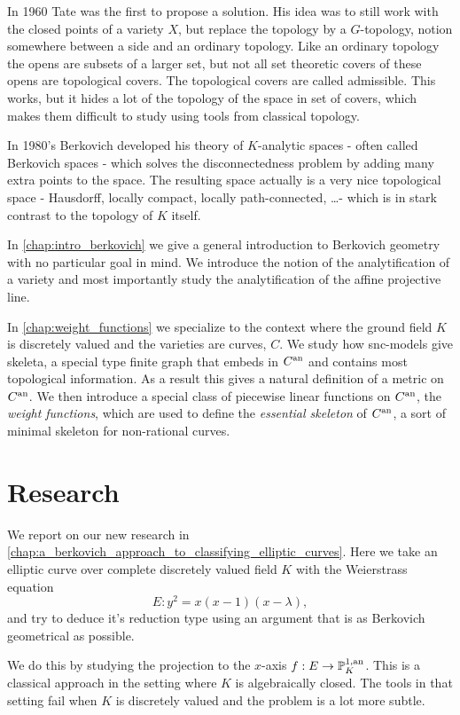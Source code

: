 In 1960 Tate was the first to propose a solution. 
His idea was to still work with the closed points of a variety $X$, but replace the topology by a $G$-topology, notion somewhere between a side and an ordinary topology. 
Like an ordinary topology the opens are subsets of a larger set, but not all set theoretic covers of these opens are topological covers. 
The topological covers are called admissible.
This works, but it hides a lot of the topology of the space in set of covers, which makes them difficult to study using tools from classical topology.

In 1980's Berkovich developed his theory of $K$-analytic spaces - often called Berkovich spaces - which solves the disconnectedness problem by adding many extra points to the space. 
The resulting space actually is a very nice topological space - Hausdorff, locally compact, locally path-connected, \ldots - which is in stark contrast to the topology of $K$ itself.  

\medskip 
In \cref{chap:intro_berkovich} we give a general introduction to Berkovich geometry with no particular goal in mind. 
We introduce the notion of the analytification of a variety and most importantly study the analytification of the affine projective line. 
 
In \cref{chap:weight_functions} we specialize to the context where the ground field $K$ is discretely valued and the varieties are curves, $C$.  
We study how snc-models give skeleta, a special type finite graph that embeds in $C{}^{\text{an}}$ and contains most topological information. 
As a result this gives a natural definition of a metric on $C{}^{\text{an}}$. 
We then introduce a special class of piecewise linear functions on $C{}^{\text{an}}$, the \emph{weight functions}, which are used to define the \emph{essential skeleton} of $C{}^{\text{an}}$, a sort of minimal skeleton for non-rational curves. 


\section{Research} \label{sec:research}

We report on our new research in \cref{chap:a_berkovich_approach_to_classifying_elliptic_curves}. 
Here we take  an elliptic curve over complete discretely valued field $K$ with the Weierstrass equation \[
	E: y^2 = x(x-1)(x-\lambda)
,\] 
and try to deduce it's reduction type using an argument that is as Berkovich geometrical as possible. 

We do this by studying the projection to the $x$-axis $f: E\to \mathbb{P}^{1, \text{an}}_K$.
This is a classical approach in the setting where $K$ is algebraically closed. 
The tools in that setting fail when $K$ is discretely valued and the problem is a lot more subtle. 


